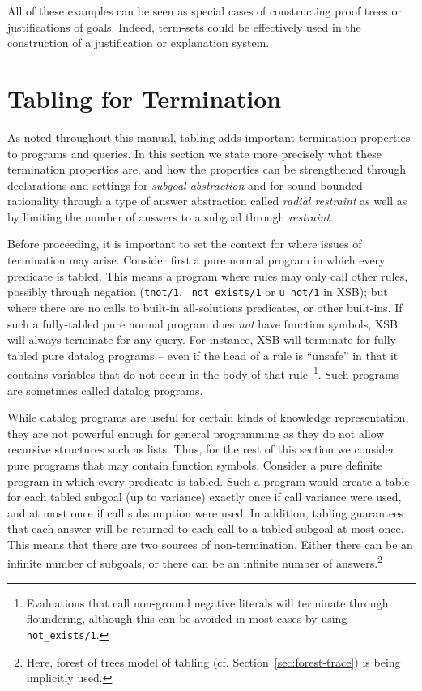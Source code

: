 All of these examples can be seen as special cases of constructing
proof trees or justifications of goals.  Indeed, term-sets could be
effectively used in the construction of a justification or explanation
system.

\section{Tabling for Termination} \label{sec:tabling-termination}
%
As noted throughout this manual, tabling adds important termination
properties to programs and queries.  In this section we state more
precisely what these termination properties are, and how the
properties can be strengthened through declarations and settings for
{\em subgoal abstraction} and for sound bounded rationality through a
type of answer abstraction called {\em radial restraint} as well as by
limiting the number of answers to a subgoal through {\em \maxans{}
  restraint}.

Before proceeding, it is important to set the context for where issues
of termination may arise.  Consider first a pure normal program in
which every predicate is tabled.  This means a program where rules may
only call other rules, possibly through negation ({\tt tnot/1}, {\tt
  not\_exists/1} or {\tt u\_not/1} in XSB); but where there are no
calls to built-in all-solutions predicates, or other built-ins.  If
such a fully-tabled pure normal program does {\em not} have function
symbols, XSB will always terminate for any query.  For instance, XSB
will terminate for fully tabled pure datalog programs -- even if the
head of a rule is ``unsafe'' in that it contains variables that do not
occur in the body of that rule~\footnote{Evaluations that call
  non-ground negative literals will terminate through floundering,
  although this can be avoided in most cases by using {\tt
    not\_exists/1}.}.  Such programs are sometimes called datalog
programs.

While datalog programs are useful for certain kinds of knowledge
representation, they are not powerful enough for general programming
as they do not allow recursive structures such as lists.  Thus, for
the rest of this section we consider pure programs that may contain
function symbols.  Consider a pure definite program in which every
predicate is tabled.  Such a program would create a table for each
tabled subgoal (up to variance) exactly once if call variance were
used, and at most once if call subsumption were used.  In addition,
tabling guarantees that each answer will be returned to each call to a
tabled subgoal at most once.  This means that there are two sources of
non-termination.  Either there can be an infinite number of subgoals,
or there can be an infinite number of answers.\footnote{Here, forest
  of trees model of tabling (cf. Section~\ref{sec:forest-trace}) is
  being implicitly used.}

